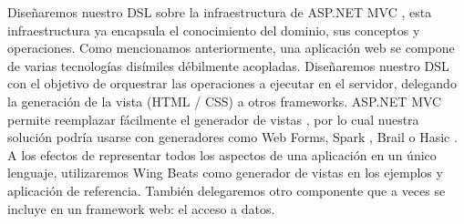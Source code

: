 \documentclass[12pt]{report}
\begin{document}
Diseñaremos nuestro DSL sobre la infraestructura de ASP.NET MVC \cite{mvc}, esta infraestructura ya encapsula el conocimiento del dominio, sus conceptos y operaciones. 
Como mencionamos anteriormente, una aplicación web se compone de varias tecnologías disímiles débilmente acopladas. Diseñaremos nuestro DSL con el objetivo de orquestrar las operaciones a ejecutar en el servidor, delegando la generación de la vista (HTML / CSS) a otros frameworks. ASP.NET MVC permite reemplazar fácilmente el generador de vistas \cite{mvcrender}, por lo cual nuestra solución podría usarse con generadores como Web Forms, Spark \cite{spark}, Brail \cite{brail} o Hasic \cite{hasic}. A los efectos de representar todos los aspectos de una aplicación en un único lenguaje, utilizaremos Wing Beats \cite{wingbeats} como generador de vistas en los ejemplos y aplicación de referencia.
También delegaremos otro componente que a veces se incluye en un framework web: el acceso a datos.



\end{document}

